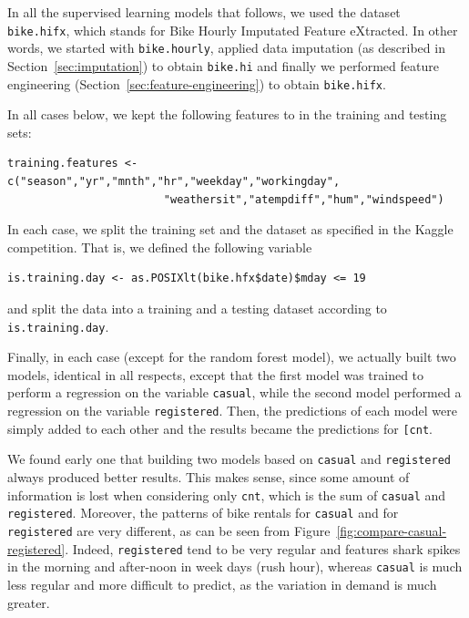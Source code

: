 \documentclass[12pt]{article}
\begin{document}
In all the supervised learning models that follows, we used the dataset \texttt{bike.hifx}, which stands for Bike Hourly Imputated Feature eXtracted. In other words, we started with \texttt{bike.hourly}, applied data imputation (as described in Section~\ref{sec:imputation}) to obtain \texttt{bike.hi} and finally we performed feature engineering (Section~\ref{sec:feature-engineering}) to obtain \texttt{bike.hifx}.

In all cases below, we kept the following features to in the training and testing sets:
{\color{blue}
\begin{verbatim}
training.features <-  c("season","yr","mnth","hr","weekday","workingday",
						"weathersit","atempdiff","hum","windspeed")
\end{verbatim}}

In each case, we split the training set and the dataset as specified in the Kaggle competition. That is, we defined the following variable
{\color{blue}
\begin{verbatim}
is.training.day <- as.POSIXlt(bike.hfx$date)$mday <= 19
\end{verbatim}}
and split the data into a training and a testing dataset according to \texttt{is.training.day}.

Finally, in each case (except for the random forest model), we actually built two models, identical in all respects, except that the first model was trained to perform a regression on the variable \texttt{casual}, while the second model performed a regression on the variable \texttt{registered}. Then, the predictions of each model were simply added to each other and the results became the predictions for \texttt{[cnt}.

We found early one that building two models based on \texttt{casual} and \texttt{registered} always produced better results. This makes sense, since some amount of information is lost when considering only \texttt{cnt}, which is the sum of \texttt{casual} and \texttt{registered}. Moreover, the patterns of bike rentals for \texttt{casual} and for \texttt{registered} are very different, as can be seen from Figure~\ref{fig:compare-casual-registered}. Indeed, \texttt{registered} tend to be very regular and features shark spikes in the morning and after-noon in week days (rush hour), whereas \texttt{casual} is much less regular and more difficult to predict, as the variation in demand is much greater.
\end{document}
